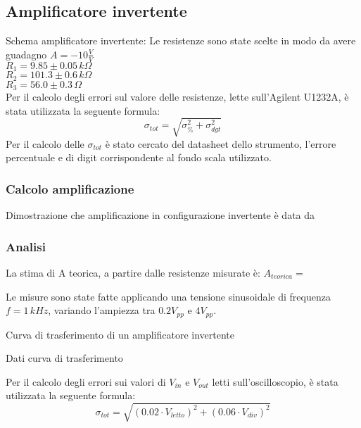 \subsection{Amplificatore invertente}
Schema amplificatore invertente:
Le resistenze sono state scelte in modo da avere guadagno $A=-10 \frac{V}{V}$\\
$R_1=9.85 \pm 0.05\,k\Omega $\\ %
$R_2=101.3 \pm 0.6\,k\Omega$\\ %
$R_3=56.0 \pm 0.3\,\Omega$\\ %

Per il calcolo degli errori sul valore delle resistenze, lette sull'Agilent U1232A, è stata utilizzata la seguente formula:
$$\sigma_{tot}=\sqrt{ \sigma^{2} _{\%} + \sigma^{2} _{dgt}}$$
Per il calcolo delle $\sigma_{tot}$ è stato cercato del datasheet dello strumento, l'errore percentuale e di digit
corrispondente al fondo scala utilizzato.

\subsubsection{Calcolo amplificazione}
Dimostrazione che amplificazione in configurazione invertente è data da %

\subsubsection{Analisi}
La stima di A teorica, a partire dalle resistenze misurate è:
$A_{teorica}=$ %

Le misure sono state fatte applicando una tensione sinusoidale di frequenza $ f=1 \,kHz$, variando l'ampiezza tra 
$0.2 V_{pp}$ e $4 V_{pp}$.

\begin{grafico} 
 \centering 
  
 \caption{Curva di trasferimento di un amplificatore invertente} 
 \label{gr:amp_inv.tex} 
\end{grafico}

\begin{tabella}
 \centering
  
 \caption{Dati curva di trasferimento}
 \label{tab:tab_inv.tex}
\end{tabella}

Per il calcolo degli errori sui valori di $V_{in}$ e $V_{out}$ letti sull'oscilloscopio, è stata utilizzata la seguente formula:
$$\sigma_{tot}=\sqrt{ (0.02\cdot V_{letto})^2 + (0.06 \cdot V_{div})^2}$$

